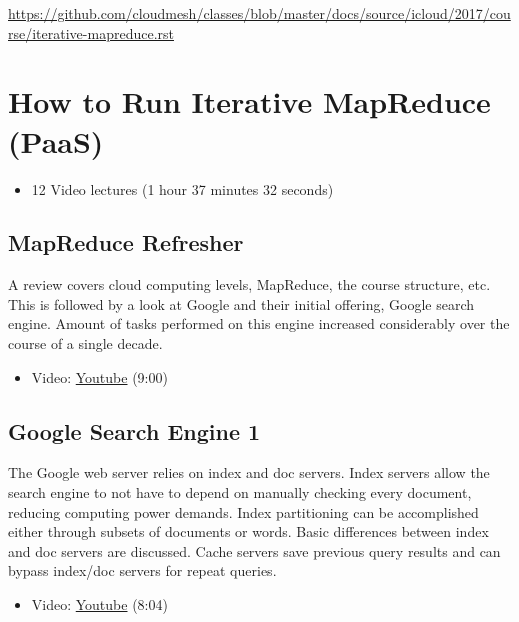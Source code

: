 \begin{fileremark}\url{https://github.com/cloudmesh/classes/blob/master/docs/source/icloud/2017/course/iterative-mapreduce.rst}\end{fileremark}
\section{How to Run Iterative MapReduce
(PaaS)}\label{how-to-run-iterative-mapreduce-paas}

\begin{itemize}
\tightlist
\item
  12 Video lectures (1 hour 37 minutes 32 seconds)
\end{itemize}

\subsection{MapReduce Refresher}\label{mapreduce-refresher}

A review covers cloud computing levels, MapReduce, the course structure,
etc. This is followed by a look at Google and their initial offering,
Google search engine. Amount of tasks performed on this engine increased
considerably over the course of a single decade.

\begin{itemize}
\tightlist
\item
  Video: \href{https://www.youtube.com/watch?v=0TRTdzgC_N0}{Youtube}
  (9:00)
\end{itemize}

\subsection{Google Search Engine 1}\label{google-search-engine-1}

The Google web server relies on index and doc servers. Index servers
allow the search engine to not have to depend on manually checking every
document, reducing computing power demands. Index partitioning can be
accomplished either through subsets of documents or words. Basic
differences between index and doc servers are discussed. Cache servers
save previous query results and can bypass index/doc servers for repeat
queries.

\begin{itemize}
\tightlist
\item
  Video: \href{https://www.youtube.com/watch?v=S2oT7uMw5Yg}{Youtube}
  (8:04)
\end{itemize}

